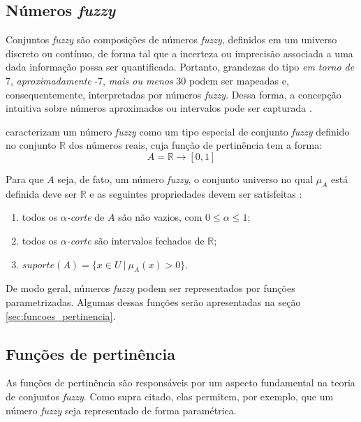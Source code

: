 \subsection{Números \emph{fuzzy}}
\label{sec:numeros_fuzzy}
Conjuntos \emph{fuzzy} são composições de números \emph{fuzzy}, definidos em um universo discreto ou contínuo, de forma tal que a incerteza ou imprecisão associada a uma dada informação possa ser quantificada. Portanto, grandezas do tipo \emph{em torno de} 7, \emph{aproximadamente} -7, \emph{mais ou menos} 30 podem ser mapeadas e, consequentemente, interpretadas por números \emph{fuzzy}. Dessa forma, a concepção intuitiva sobre números aproximados ou intervalos pode ser capturada \citep{klir:95}.

\citet{klir:95} caracterizam um número \emph{fuzzy} como um tipo especial de conjunto \emph{fuzzy} definido no conjunto $\mathbb{R}$ dos números reais, cuja função de pertinência tem a forma:
\begin{equation}
\label{eq:fuzzy_numero_reais}
  A = \mathbb{R} \rightarrow [0, 1]
\end{equation}

Para que $A$ seja, de fato, um número \emph{fuzzy}, o conjunto universo no qual $\mu_A$ está definida deve ser $\mathbb{R}$ e as seguintes propriedades devem ser satisfeitas \citep{barros:06}:
\begin{enumerate}[label=(\roman*)]
\item todos os $\alpha$\emph{-corte} de $A$ são não vazios, com $0 \leq \alpha \leq 1$;
\item todos os $\alpha$\emph{-corte} são intervalos fechados de $\mathbb{R}$;
\item $suporte(A) = \{x \in U \ |\ \mu_A(x) > 0\}$.
\end{enumerate}

De modo geral, números \emph{fuzzy} podem ser representados por funções parametrizadas. Algumas dessas funções serão apresentadas na seção \ref{sec:funcoes_pertinencia}.

\subsection{Funções de pertinência}
\label{sec:funcoes_pertinencia}
As funções de pertinência são responsáveis por um aspecto fundamental na teoria de conjuntos \emph{fuzzy}. Como supra citado, elas permitem, por exemplo, que um número \emph{fuzzy} seja representado de forma paramétrica.

